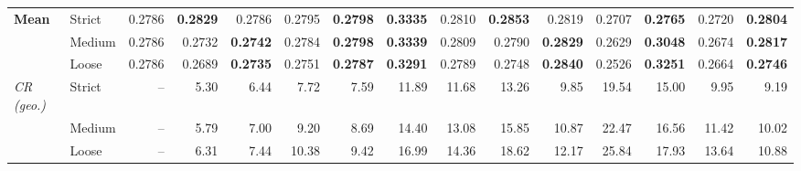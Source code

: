 \begin{tabular*}{\textwidth}{@{\extracolsep{\fill}}llr*{6}{rr}@{}}
\cmidrule(lr){1-15}
\textbf{Mean} & Strict & 0.2786 & \textbf{0.2829} & 0.2786 & 0.2795 & \textbf{0.2798} & \textbf{0.3335} & 0.2810 & \textbf{0.2853} & 0.2819 & 0.2707 & \textbf{0.2765} & 0.2720 & \textbf{0.2804} \\
 & Medium & 0.2786 & 0.2732 & \textbf{0.2742} & 0.2784 & \textbf{0.2798} & \textbf{0.3339} & 0.2809 & 0.2790 & \textbf{0.2829} & 0.2629 & \textbf{0.3048} & 0.2674 & \textbf{0.2817} \\
 & Loose & 0.2786 & 0.2689 & \textbf{0.2735} & 0.2751 & \textbf{0.2787} & \textbf{0.3291} & 0.2789 & 0.2748 & \textbf{0.2840} & 0.2526 & \textbf{0.3251} & 0.2664 & \textbf{0.2746} \\
\addlinespace[2pt]
\textit{CR (geo.)} & Strict & -- & 5.30 & 6.44 & 7.72 & 7.59 & 11.89 & 11.68 & 13.26 & 9.85 & 19.54 & 15.00 & 9.95 & 9.19 \\
 & Medium & -- & 5.79 & 7.00 & 9.20 & 8.69 & 14.40 & 13.08 & 15.85 & 10.87 & 22.47 & 16.56 & 11.42 & 10.02 \\
 & Loose & -- & 6.31 & 7.44 & 10.38 & 9.42 & 16.99 & 14.36 & 18.62 & 12.17 & 25.84 & 17.93 & 13.64 & 10.88 \\
\bottomrule
\end{tabular*}
\endgroup
